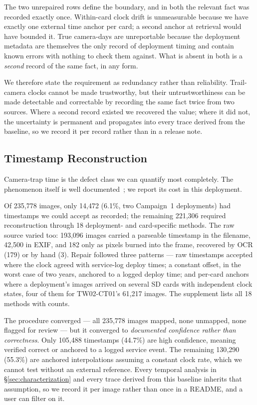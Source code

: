 \documentclass[sigconf]{acmart}
\begin{document}
The two unrepaired rows define the boundary, and in both the relevant
fact was recorded exactly once. Within-card clock drift is unmeasurable because
we have exactly one external time anchor per card; a second anchor at
retrieval would have bounded it. True camera-days are unreportable
because the deployment metadata are themselves the only record of
deployment timing and contain known errors with nothing to check them
against. What is absent in both is a \emph{second} record of the same
fact, in any form.

We therefore state the requirement as redundancy rather than
reliability. Trail-camera clocks cannot be made trustworthy, but their
untrustworthiness can be made detectable and correctable by recording
the same fact twice from two sources. Where a second record existed we
recovered the value; where it did not, the uncertainty is permanent and
propagates into every trace derived from the baseline, so we record it
per record rather than in a release note.

\subsection{Timestamp Reconstruction}
\label{sec:timestamps}

Camera-trap time is the defect class we can quantify most completely.
The phenomenon itself is well
documented~\cite{lahozmonfort2021monitoring}; we report its cost in this
deployment.

Of 235{,}778 images, only 14{,}472 (6.1\%, two Campaign~1 deployments)
had timestamps we could accept as recorded; the remaining
221{,}306 required reconstruction through 18 deployment- and
card-specific methods. The raw source varied too: 193{,}096 images
carried a parseable timestamp in the filename, 42{,}500 in EXIF, and
182 only as pixels burned into the frame, recovered by OCR (179) or by
hand (3). Repair followed three patterns --- raw timestamps accepted
where the clock agreed with service-log deploy times; a constant offset,
in the worst case of two years, anchored to a logged deploy time; and
per-card anchors where a deployment's images arrived on several SD cards
with independent clock states, four of them for TW02-CT01's
61{,}217 images. The supplement lists all 18 methods with counts.

The procedure converged --- all 235{,}778 images mapped, none unmapped,
none flagged for review --- but it converged to \emph{documented
confidence rather than correctness}. Only 105{,}488 timestamps (44.7\%)
are high confidence, meaning verified correct or anchored to a logged
service event. The remaining 130{,}290 (55.3\%) are anchored
interpolations assuming a constant clock rate, which we cannot test
without an external reference. Every temporal analysis in
\S\ref{sec:characterization} and every trace derived from this baseline
inherits that assumption, so we record it per image rather than once in
a README, and a user can filter on it.
\end{document}
